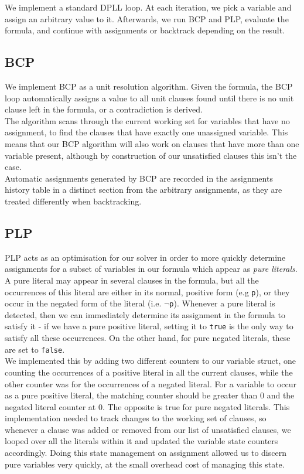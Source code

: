 \documentclass[a4paper]{article}
\begin{document}
We implement a standard DPLL loop. At each iteration, we pick a variable and assign an arbitrary value to it. Afterwards, we run BCP and PLP, evaluate the formula, and continue with assignments or backtrack depending on the result.\\

\subsection{BCP}

We implement BCP as a unit resolution algorithm. Given the formula, the BCP loop automatically assigns a value to all unit clauses found until there is no unit clause left in the formula, or a contradiction is derived.\\
The algorithm scans through the current working set for variables that have no assignment, to find the clauses that have exactly one unassigned variable. This means that our BCP algorithm will also work on clauses that have more than one variable present, although by construction of our unsatisfied clauses this isn't the case.\\
Automatic assignments generated by BCP are recorded in the assignments history table in a distinct section from the arbitrary assignments, as they are treated differently when backtracking.\\

\subsection{PLP}

PLP acts as an optimisation for our solver in order to more quickly determine assignments for a subset of variables in our formula which appear as \textit{pure literals}. A pure literal may appear in several clauses in the formula, but all the occurrences of this literal are either in its normal, positive form (e.g \texttt{p}), or they occur in the negated form of the literal (i.e. $\neg$\texttt{p}). Whenever a pure literal is detected, then we can immediately determine its assignment in the formula to satisfy it - if we have a pure positive literal, setting it to \texttt{true} is the only way to satisfy all these occurrences. On the other hand, for pure negated literals, these are set to \texttt{false}. \\

We implemented this by adding two different counters to our variable struct, one counting the occurrences of a positive literal in all the current clauses, while the other counter was for the occurrences of a negated literal. For a variable to occur as a pure positive literal, the matching counter should be greater than 0 and the negated literal counter at 0. The opposite is true for pure negated literals. This implementation needed to track changes to the working set of clauses, so whenever a clause was added or removed from our list of unsatisfied clauses, we looped over all the literals within it and updated the variable state counters accordingly. Doing this state management on assignment allowed us to discern pure variables very quickly, at the small overhead cost of managing this state.
\end{document}

